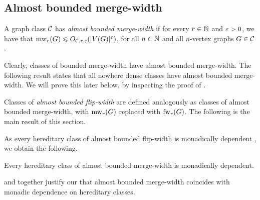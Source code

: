 \subsection{Almost bounded merge-width}\label{sec:abmw}
A graph class $\mathcal C$ has \emph{almost bounded merge-width}
if for every $r\in\mathbb N$ and $\varepsilon>0$,
we have that $\operatorname{mw}_r(G)\leqslant O_{\mathcal C,r,\varepsilon}(|V(G)|^\varepsilon)$, for all $n\in\mathbb N$ and all $n$-vertex graphs $G\in\mathcal C$.

Clearly, classes of bounded merge-width have almost bounded merge-width.
The following result states that all nowhere dense classes have almost bounded merge-width. We will prove this later below, by inspecting the proof of .

\thmnwd*

Classes of \emph{almost bounded flip-width} are defined analogously as classes of almost bounded merge-width, with $\operatorname{mw}_r(G)$ replaced with $\operatorname{fw}_r(G)$.
The following is the main result of this section.

\thmabmw*

As every hereditary class of almost bounded flip-width is monadically dependent \cite[Thm. 2.12]{flip-breakability}, we obtain the following.
\begin{corollary}\label{cor:abmw-mNIP}
    Every hereditary class of almost bounded merge-width is monadically dependent.
\end{corollary}

 and  together justify our 
that almost bounded merge-width coincides with monadic dependence on hereditary classes.





